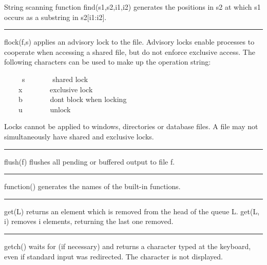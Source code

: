 \noindent
{}String scanning function find(s1,s2,i1,i2) generates
the positions in s2 at which s1 occurs as a substring in s2[i1:i2].

\bigskip\hrule\vspace{0.1cm}

\noindent
{}flock(f,s) applies an advisory
lock to the file. Advisory locks enable processes to
cooperate when accessing a shared file, but do not enforce exclusive
access. The following characters can be used to make up the operation
string: 

\ \ \ \ \ s \ \ \ \ \ \ \ shared lock\\
 \ \ \ \ x \ \ \ \ \ \ \ exclusive lock\\
 \ \ \ \ b \ \ \ \ \ \ \ don{\textquotesingle}t block when
locking\\
 \ \ \ \ u \ \ \ \ \ \ \ unlock 

Locks cannot be applied to windows, directories or database files. A
file may not simultaneously have shared and exclusive locks.

\bigskip\hrule\vspace{0.1cm}

\noindent
{}\textsf{flush(f)} flushes all pending or buffered output
to file \textsf{f}.

\bigskip\hrule\vspace{0.1cm}

\noindent
\textsf{function()} generates the names of the built-in functions.

\bigskip\hrule\vspace{0.1cm}

\noindent
\textsf{get(L)} returns an element which is removed from the head of the
queue \textsf{L}. \textsf{get(L, i)} removes \textsf{i}
elements, returning the last one removed.

\bigskip\hrule\vspace{0.1cm}

\noindent
\textsf{getch()} waits for (if necessary) and returns a character typed
at the keyboard, even if standard input was redirected.
The character is not displayed.

